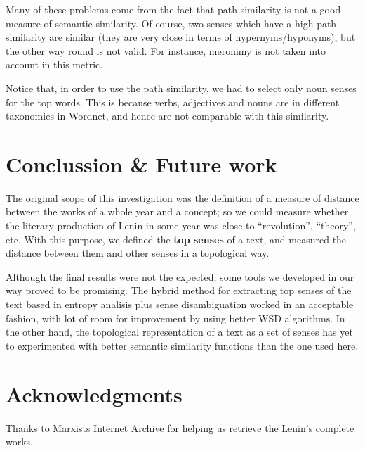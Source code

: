 \documentclass{pnastwo}
\begin{document}
\begin{article}
Many of these problems come from the fact that path similarity is not a good measure of semantic similarity. Of course, two senses which have a high path similarity are similar (they are very close in terms of hypernyms/hyponyms), but the other way round is not valid. For instance, meronimy is not taken into account in this metric.
 
Notice that, in order to use the path similarity, we had to select only noun senses for the top words. This is because verbs, adjectives and nouns are in different taxonomies in Wordnet, and hence are not comparable with this similarity. 





\section{Conclussion \& Future work}

The original scope of this investigation was the definition of a measure of distance between the works of a whole year and a concept; so we could measure whether the literary production of Lenin in some year was close to ``revolution'', ``theory'', etc.  With this purpose, we defined the \textbf{top senses} of a text, and measured the distance between them and other senses in a topological way.

Although the final results were not the expected, some tools we developed in our way proved to be promising. The hybrid method for extracting top senses of the text based in entropy analisis plus sense disambiguation worked in an acceptable fashion, with lot of room for improvement by using better WSD algorithms. In the other hand, the topological representation of a text as a set of senses has yet to experimented with better semantic similarity functions than the one used here. 

\section{Acknowledgments}
Thanks to \hyperlink{https://www.marxists.org}{Marxists Internet Archive} for helping us retrieve the Lenin's complete works.










\end{article}
\end{document}
